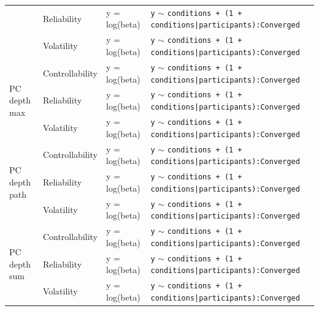 \begin{tabular}{llll}
\cmidrule(lr){2-4} \cmidrule(lr){3-4}
 & Reliability & y = log(beta) & \texttt{y} $\sim$ \texttt{conditions + (1 + conditions|participants):Converged} \\
\cmidrule(lr){2-4} \cmidrule(lr){3-4}
 & Volatility & y = log(beta) & \texttt{y} $\sim$ \texttt{conditions + (1 + conditions|participants):Converged} \\
\cmidrule(lr){1-4} \cmidrule(lr){2-4} \cmidrule(lr){3-4}
\multirow[t]{3}{*}{PC depth max} & Controllability & y = log(beta) & \texttt{y} $\sim$ \texttt{conditions + (1 + conditions|participants):Converged} \\
\cmidrule(lr){2-4} \cmidrule(lr){3-4}
 & Reliability & y = log(beta) & \texttt{y} $\sim$ \texttt{conditions + (1 + conditions|participants):Converged} \\
\cmidrule(lr){2-4} \cmidrule(lr){3-4}
 & Volatility & y = log(beta) & \texttt{y} $\sim$ \texttt{conditions + (1 + conditions|participants):Converged} \\
\cmidrule(lr){1-4} \cmidrule(lr){2-4} \cmidrule(lr){3-4}
\multirow[t]{3}{*}{PC depth path} & Controllability & y = log(beta) & \texttt{y} $\sim$ \texttt{conditions + (1 + conditions|participants):Converged} \\
\cmidrule(lr){2-4} \cmidrule(lr){3-4}
 & Reliability & y = log(beta) & \texttt{y} $\sim$ \texttt{conditions + (1 + conditions|participants):Converged} \\
\cmidrule(lr){2-4} \cmidrule(lr){3-4}
 & Volatility & y = log(beta) & \texttt{y} $\sim$ \texttt{conditions + (1 + conditions|participants):Converged} \\
\cmidrule(lr){1-4} \cmidrule(lr){2-4} \cmidrule(lr){3-4}
\multirow[t]{3}{*}{PC depth sum} & Controllability & y = log(beta) & \texttt{y} $\sim$ \texttt{conditions + (1 + conditions|participants):Converged} \\
\cmidrule(lr){2-4} \cmidrule(lr){3-4}
 & Reliability & y = log(beta) & \texttt{y} $\sim$ \texttt{conditions + (1 + conditions|participants):Converged} \\
\cmidrule(lr){2-4} \cmidrule(lr){3-4}
 & Volatility & y = log(beta) & \texttt{y} $\sim$ \texttt{conditions + (1 + conditions|participants):Converged} \\
\cmidrule(lr){1-4} \cmidrule(lr){2-4} \cmidrule(lr){3-4}
\bottomrule
\end{tabular}
